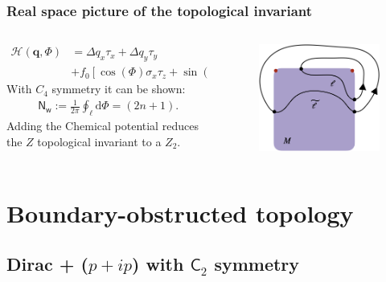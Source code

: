 \documentclass{beamer}
\newcommand{\ms}{\mathsf}
\renewcommand{\(}{\left(}
\renewcommand{\)}{\right)}
\renewcommand{\[}{\left[}
\renewcommand{\]}{\right]}
\begin{document}
\begin{frame}
    \frametitle{Real space picture of the topological invariant}
    \begin{columns}
        \begin{column}{0.6\textwidth}
            \begin{align*}
                \mathcal H(\bm{q},\Phi)&=\Delta q_{x}\tau_x + \Delta q_{y}\tau_y\\ &+ f_0 \left[ \cos (\Phi) \sigma_x \tau_z +\sin(\Phi) \sigma_z \tau_z \right]
            \end{align*}
            With $C_4$ symmetry it can be shown: 
            \begin{align*}
                \mathsf{N}_{\mathsf{w}}:=\frac{1}{2\pi}\oint_{\ell} \mathrm{d}\Phi = (2n + 1).
            \end{align*}
            Adding the Chemical potential reduces the $Z$ topological invariant to a $Z_2$. 
        \end{column}
        \begin{column}{0.4\textwidth}
            \begin{figure}[]
                \centering
                \includegraphics[scale=0.3]{Real_space_path.png}
            \end{figure}
        \end{column}
    \end{columns}

\end{frame}


\section{Boundary-obstructed topology}
\subsection{Dirac + \texorpdfstring{($p+ip$)}{} with \texorpdfstring{$\ms{C}_2$}{} symmetry}
\end{document}
